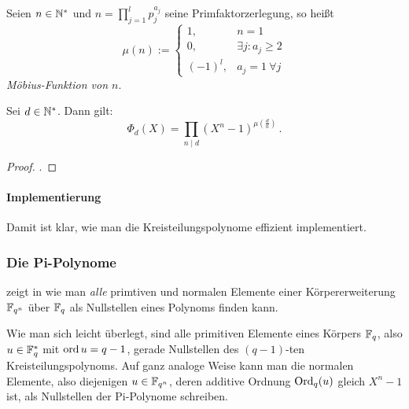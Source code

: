 \begin{definition}
  Seien $n \in \mathbb{N}^\ast$ und $n = \prod_{j=1}^l p_j^{a_j}$ seine
  Primfaktorzerlegung, so heißt
  \[ \mu(n) := \begin{cases} 1, &n=1\\ 0,& \exists j: a_j \geq 2\\
    (-1)^l, & a_j=1 \ \forall j \end{cases}\]
  \emph{Möbius-Funktion von $n$}.
\end{definition}

\begin{prop}
  Sei $d\in \mathbb{N}^\ast$. Dann gilt: 
  \[ \Phi_d(X) = \prod_{n\mid d} (X^n-1)^{\mu(\frac{d}{n})} \,.\]
\end{prop}
\begin{proof}
  \autocite[Abschnitt 4]{hach2013eki}.
\end{proof}

\paragraph{Implementierung}

Damit ist klar, wie man die Kreisteilungspolynome effizient implementiert.




\subsubsection{Die Pi-Polynome}

\citeauthor{hach92} zeigt in \autocite{hach92} wie man
\emph{alle} primtiven und normalen Elemente einer Körpererweiterung $\mathbb{F}_{q^n}$
über $\mathbb{F}_q$ als Nullstellen eines Polynoms finden kann.

\begin{bemerkung}
  \label{bem:primnorm}
  Wie man sich leicht überlegt, sind alle primitiven Elemente eines Körpers
  $\mathbb{F}_q$, also $u \in \mathbb{F}_q^\ast$ mit $\operatorname{ord} u = q-1$, gerade Nullstellen des
  $(q-1)$-ten Kreisteilungspolynoms. Auf ganz analoge Weise kann man die normalen
  Elemente, also diejenigen $u\in \mathbb{F}_{q^n}$, deren additive Ordnung 
  $\operatorname{Ord}_q(u)$ gleich $X^n-1$ ist, als Nullstellen der Pi-Polynome schreiben.
\end{bemerkung}

